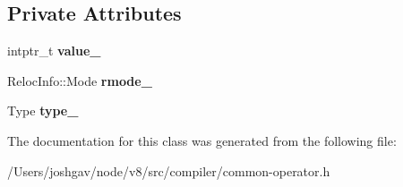 \subsection*{Private Attributes}
\begin{DoxyCompactItemize}
\item 
intptr\+\_\+t {\bfseries value\+\_\+}\hypertarget{classv8_1_1internal_1_1compiler_1_1_relocatable_ptr_constant_info_a6aed5178bbe873bead209d1fec79d55e}{}\label{classv8_1_1internal_1_1compiler_1_1_relocatable_ptr_constant_info_a6aed5178bbe873bead209d1fec79d55e}

\item 
Reloc\+Info\+::\+Mode {\bfseries rmode\+\_\+}\hypertarget{classv8_1_1internal_1_1compiler_1_1_relocatable_ptr_constant_info_abf41b60c1d4ac8337c7c8495db1629ea}{}\label{classv8_1_1internal_1_1compiler_1_1_relocatable_ptr_constant_info_abf41b60c1d4ac8337c7c8495db1629ea}

\item 
Type {\bfseries type\+\_\+}\hypertarget{classv8_1_1internal_1_1compiler_1_1_relocatable_ptr_constant_info_a4cc35c01807c9e787a1f9812a596d5bc}{}\label{classv8_1_1internal_1_1compiler_1_1_relocatable_ptr_constant_info_a4cc35c01807c9e787a1f9812a596d5bc}

\end{DoxyCompactItemize}


The documentation for this class was generated from the following file\+:\begin{DoxyCompactItemize}
\item 
/\+Users/joshgav/node/v8/src/compiler/common-\/operator.\+h\end{DoxyCompactItemize}
